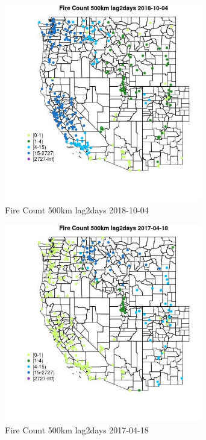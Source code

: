 \begin{figure} 
\centering  
\includegraphics[width=0.77\textwidth]{Code_Outputs/Report_ML_input_PM25_Step4_part_f_de_duplicated_aveswNAs_MapObsFire_Count_500km_lag2days2018-10-04.jpg} 
\caption{\label{fig:Report_ML_input_PM25_Step4_part_f_de_duplicated_aveswNAsMapObsFire_Count_500km_lag2days2018-10-04}Fire Count 500km lag2days 2018-10-04} 
\end{figure} 
 

\begin{figure} 
\centering  
\includegraphics[width=0.77\textwidth]{Code_Outputs/Report_ML_input_PM25_Step4_part_f_de_duplicated_aveswNAs_MapObsFire_Count_500km_lag2days2017-04-18.jpg} 
\caption{\label{fig:Report_ML_input_PM25_Step4_part_f_de_duplicated_aveswNAsMapObsFire_Count_500km_lag2days2017-04-18}Fire Count 500km lag2days 2017-04-18} 
\end{figure} 
 

